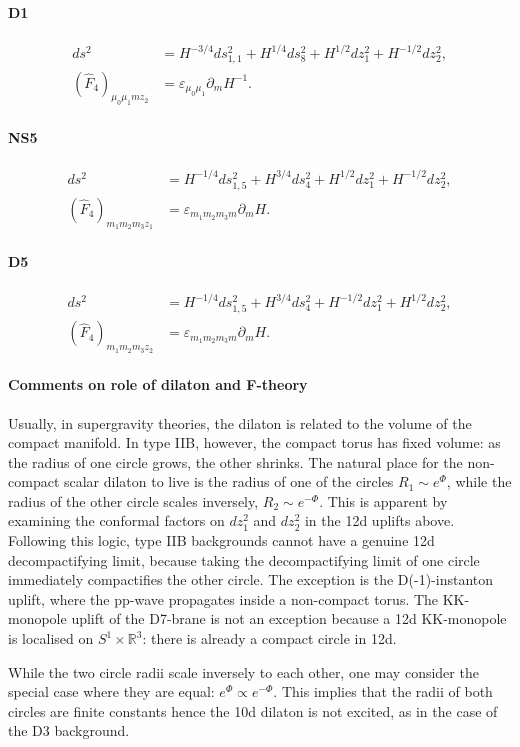\paragraph{D1}
\begin{equation}
\begin{aligned}
ds^2
&= H^{-3/4}ds_{1,1}^2
+ H^{1/4}ds_8^2
+H^{1/2}dz_1^2
+H^{-1/2}dz_2^2,\\
(\widehat{F}_4)_{\mu_0 \mu_1 m z_2}
&= \varepsilon_{\mu_0 \mu_1}\partial_m H^{-1}.
\end{aligned}
\end{equation}


\paragraph{NS5}
\begin{equation}
\begin{aligned}
ds^2
&= H^{-1/4}ds_{1,5}^2
+ H^{3/4}ds_4^2
+H^{1/2}dz_1^2
+H^{-1/2}dz_2^2,\\
(\widehat{F}_4)_{m_1 m_2 m_3 z_1}
&= \varepsilon_{m_1 m_2 m_3 m}\partial_m H.
\end{aligned}
\end{equation}

\paragraph{D5}
\begin{equation}
\begin{aligned}
ds^2
&= H^{-1/4}ds_{1,5}^2
+ H^{3/4}ds_4^2
+H^{-1/2}dz_1^2
+H^{1/2}dz_2^2,\\
(\widehat{F}_4)_{m_1 m_2 m_3 z_2}
&= \varepsilon_{m_1 m_2 m_3 m}\partial_m H.
\end{aligned}
\end{equation}


\paragraph{Comments on role of dilaton and F-theory}
Usually, in supergravity theories, the dilaton is related to the volume of the compact manifold.
In type IIB, however, the compact torus has fixed volume: as the radius of one circle grows, the other shrinks.
The natural place for the non-compact scalar dilaton to live is the radius of one of the circles $R_1 \sim e^{\Phi}$, while the radius of the other circle scales inversely, $R_2 \sim e^{-\Phi}$.
This is apparent by examining the conformal factors on $dz_1^2$ and $dz_2^2$ in the 12d uplifts above.
Following this logic, type IIB backgrounds cannot have a genuine 12d decompactifying limit, because taking the decompactifying limit of one circle immediately compactifies the other circle.
The exception is the D(-1)-instanton uplift, where the pp-wave propagates inside a non-compact torus.
The KK-monopole uplift of the D7-brane is not an exception because a 12d KK-monopole is localised on $S^1 \times \mathbb{R}^3$: there is already a compact circle in 12d.

While the two circle radii scale inversely to each other, one may consider the special case where they are equal: $e^\Phi \propto e^{-\Phi}$.
This implies that the radii of both circles are finite constants hence the 10d dilaton is not excited, as in the case of the D3 background.